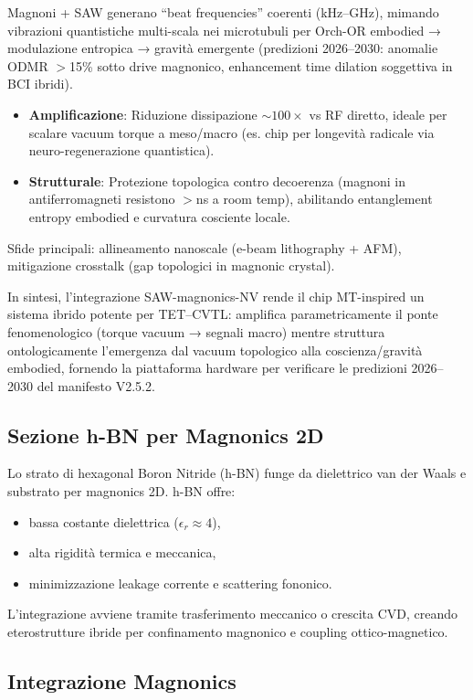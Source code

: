 \documentclass[12pt,a4paper]{article}
\begin{document}
Magnoni + SAW generano ``beat frequencies'' coerenti (kHz–GHz), mimando vibrazioni quantistiche multi-scala nei microtubuli per Orch-OR embodied → modulazione entropica → gravità emergente (predizioni 2026–2030: anomalie ODMR $>$15\% sotto drive magnonico, enhancement time dilation soggettiva in BCI ibridi).

\begin{itemize}
    \item \textbf{Amplificazione}: Riduzione dissipazione $\sim 100\times$ vs RF diretto, ideale per scalare vacuum torque a meso/macro (es. chip per longevità radicale via neuro-regenerazione quantistica).
    \item \textbf{Strutturale}: Protezione topologica contro decoerenza (magnoni in antiferromagneti resistono $>$ns a room temp), abilitando entanglement entropy embodied e curvatura cosciente locale.
\end{itemize}

Sfide principali: allineamento nanoscale (e-beam lithography + AFM), mitigazione crosstalk (gap topologici in magnonic crystal).

In sintesi, l'integrazione SAW-magnonics-NV rende il chip MT-inspired un sistema ibrido potente per TET--CVTL: amplifica parametricamente il ponte fenomenologico (torque vacuum → segnali macro) mentre struttura ontologicamente l'emergenza dal vacuum topologico alla coscienza/gravità embodied, fornendo la piattaforma hardware per verificare le predizioni 2026–2030 del manifesto V2.5.2.

\subsection{Sezione h-BN per Magnonics 2D}

Lo strato di hexagonal Boron Nitride (h-BN) funge da dielettrico van der Waals e substrato per magnonics 2D. h-BN offre:
\begin{itemize}
    \item bassa costante dielettrica ($\epsilon_r \approx 4$),
    \item alta rigidità termica e meccanica,
    \item minimizzazione leakage corrente e scattering fononico.
\end{itemize}

L'integrazione avviene tramite trasferimento meccanico o crescita CVD, creando eterostrutture ibride per confinamento magnonico e coupling ottico-magnetico.


\subsection{Integrazione Magnonics}
\end{document}
